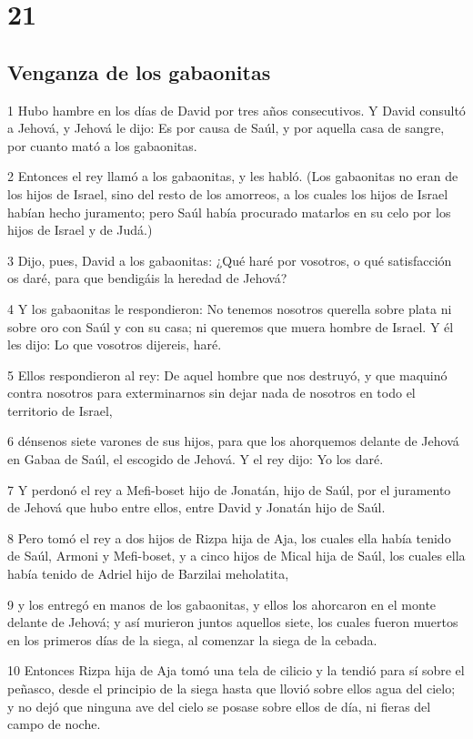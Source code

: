 \chapter{21}

\section*{Venganza de los gabaonitas}

\par 1 Hubo hambre en los días de David por tres años consecutivos. Y David consultó a Jehová, y Jehová le dijo: Es por causa de Saúl, y por aquella casa de sangre, por cuanto mató a los gabaonitas.
\par 2 Entonces el rey llamó a los gabaonitas, y les habló. (Los gabaonitas no eran de los hijos de Israel, sino del resto de los amorreos, a los cuales los hijos de Israel habían hecho juramento; pero Saúl había procurado matarlos en su celo por los hijos de Israel y de Judá.)
\par 3 Dijo, pues, David a los gabaonitas: ¿Qué haré por vosotros, o qué satisfacción os daré, para que bendigáis la heredad de Jehová?
\par 4 Y los gabaonitas le respondieron: No tenemos nosotros querella sobre plata ni sobre oro con Saúl y con su casa; ni queremos que muera hombre de Israel. Y él les dijo: Lo que vosotros dijereis, haré.
\par 5 Ellos respondieron al rey: De aquel hombre que nos destruyó, y que maquinó contra nosotros para exterminarnos sin dejar nada de nosotros en todo el territorio de Israel,
\par 6 dénsenos siete varones de sus hijos, para que los ahorquemos delante de Jehová en Gabaa de Saúl, el escogido de Jehová. Y el rey dijo: Yo los daré.
\par 7 Y perdonó el rey a Mefi-boset hijo de Jonatán, hijo de Saúl, por el juramento de Jehová que hubo entre ellos, entre David y Jonatán hijo de Saúl. 
\par 8 Pero tomó el rey a dos hijos de Rizpa hija de Aja, los cuales ella había tenido de Saúl, Armoni y Mefi-boset, y a cinco hijos de Mical hija de Saúl, los cuales ella había tenido de Adriel hijo de Barzilai meholatita, 
\par 9 y los entregó en manos de los gabaonitas, y ellos los ahorcaron en el monte delante de Jehová; y así murieron juntos aquellos siete, los cuales fueron muertos en los primeros días de la siega, al comenzar la siega de la cebada.
\par 10 Entonces Rizpa hija de Aja tomó una tela de cilicio y la tendió para sí sobre el peñasco, desde el principio de la siega hasta que llovió sobre ellos agua del cielo; y no dejó que ninguna ave del cielo se posase sobre ellos de día, ni fieras del campo de noche.
